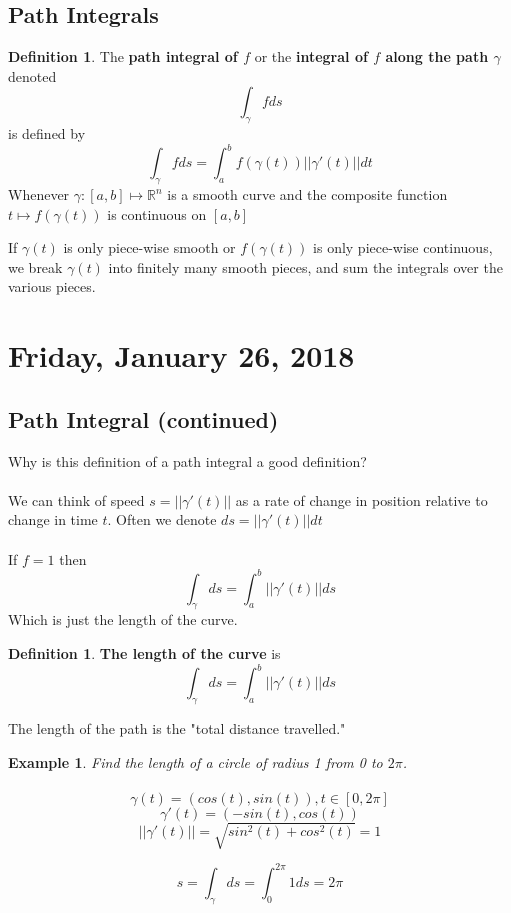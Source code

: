 \documentclass[12pt]{article}
\theoremstyle{plain}
\newtheorem{example}[theorem]{Example}
\theoremstyle{definition}
\newtheorem{definition}[theorem]{Definition}
\begin{document}
\subsection{Path Integrals}

\begin{definition}
	The \textbf{path integral of $f$} or the \textbf{integral of $f$ along the path $\gamma$} denoted
	$$\int_\gamma f ds$$
	is defined by
	$$\int_\gamma f ds = \int^b_a f(\gamma(t)) ||\gamma ' (t) || dt$$
	Whenever $\gamma: [a,b]\mapsto \mathbb{R}^n$ is a smooth curve and the composite function $t \mapsto f(\gamma(t))$ is continuous on $[a,b]$
\end{definition}

If $\gamma (t)$ is only piece-wise smooth or $f(\gamma (t))$ is only piece-wise continuous, we break $\gamma (t)$ into finitely many smooth pieces, and sum the integrals over the various pieces.

\section{Friday, January 26, 2018}

\subsection{Path Integral (continued)}

Why is this definition of a path integral a good definition?\\
\\
We can think of speed $s=||\gamma ' (t)||$ as a rate of change in position relative to change in time $t$. Often we denote $ds=||\gamma ' (t)||dt$\\
\\
If $f=1$ then
$$\int_\gamma ds = \int_a^b ||\gamma ' (t)|| ds$$
Which is just the length of the curve.

\begin{definition}
	\textbf{The length of the curve} is $$\int_\gamma ds = \int_a^b ||\gamma ' (t)|| ds$$
\end{definition}

The length of the path is the "total distance travelled."

\begin{example}
	Find the length of a circle of radius 1 from 0 to $2\pi$.\\
	\\
	$$\gamma (t) = (cos(t), sin(t)), t\in [0, 2\pi]$$
	$$\gamma ' (t) = (-sin(t), cos(t))$$
	$$||\gamma ' (t)|| = \sqrt{sin^2(t) + cos^2(t)} = 1$$


	$$s = \int_\gamma ds = \int_0^{2\pi} 1 ds = 2\pi$$
\end{example}
\end{document}
